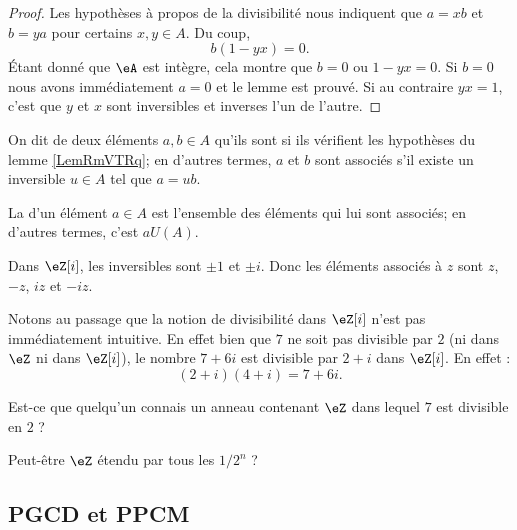 \begin{proof}
    Les hypothèses à propos de la divisibilité nous indiquent que \( a=xb\) et \( b=ya\) pour certains \( x,y\in A\). Du coup,
    \begin{equation}
        b(1-yx)=0.
    \end{equation}
    Étant donné que \( \eA\) est intègre, cela montre que \( b=0\) ou \( 1-yx=0\). Si \( b=0\) nous avons immédiatement \( a=0\) et le lemme est prouvé. Si au contraire \( yx=1\), c'est que \( y\) et \( x\) sont inversibles et inverses l'un de l'autre.
\end{proof}

\begin{definition}\label{DefrXUixs}
    On dit de deux éléments \( a,b\in A\) qu'ils sont  si ils vérifient les hypothèses du lemme \ref{LemRmVTRq}; en d'autres termes, $a$ et $b$ sont associés s'il existe un inversible \( u\in A\) tel que \( a=ub\).

    La  d'un élément \( a \in A \) est l'ensemble des éléments qui lui sont associés; en d'autres termes, c'est \( a  U(A) \).
\end{definition}

\begin{example}
    Dans \( \eZ[i]\), les inversibles sont \( \pm 1\) et \( \pm i\). Donc les éléments associés à \( z\) sont \( z\), \( -z\), \( iz\) et \( -iz\).

    Notons au passage que la notion de divisibilité dans \( \eZ[i]\) n'est pas immédiatement intuitive. En effet bien que \( 7\) ne soit pas divisible par \( 2\) (ni dans \( \eZ\) ni dans \( \eZ[i]\)), le nombre \( 7+6i\) est divisible par \( 2+i\) dans \( \eZ[i]\). En effet :
    \begin{equation}
        (2+i)(4+i)=7+6i.
    \end{equation}
\end{example}

\begin{probleme}
    Est-ce que quelqu'un connais un anneau contenant \( \eZ\) dans lequel \( 7\) est divisible en \( 2\) ?

    Peut-être \( \eZ\) étendu par tous les \( 1/2^n\) ?
\end{probleme}

\subsection{PGCD et PPCM}

